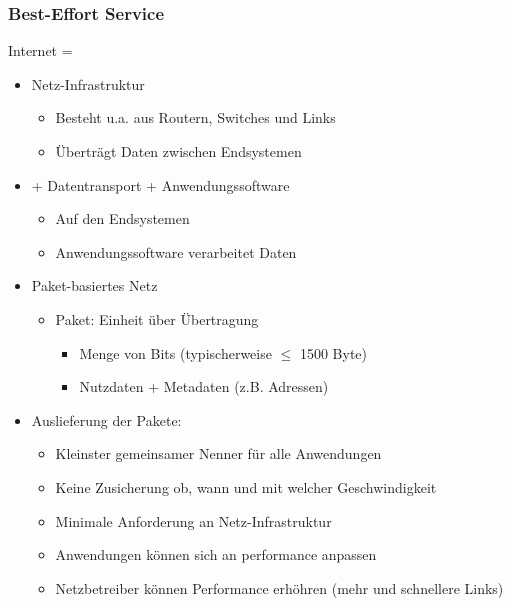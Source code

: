     \subsubsection{Best-Effort Service}
      Internet =
        \begin{itemize}
          \item Netz-Infrastruktur
            \begin{itemize}
              \item Besteht u.a. aus Routern, Switches und Links
              \item Überträgt Daten zwischen Endsystemen
            \end{itemize}
          \item + Datentransport + Anwendungssoftware
            \begin{itemize}
              \item Auf den Endsystemen
              \item Anwendungssoftware verarbeitet Daten
            \end{itemize}
          \item Paket-basiertes Netz
            \begin{itemize}
              \item Paket: Einheit über Übertragung
                \begin{itemize}
                  \item Menge von Bits (typischerweise $\le$ 1500 Byte)
                  \item Nutzdaten + Metadaten (z.B. Adressen)
                \end{itemize}
            \end{itemize}
          \item Auslieferung der Pakete:
            \begin{itemize}
              \item Kleinster gemeinsamer Nenner für alle Anwendungen
              \item Keine Zusicherung ob, wann und mit welcher Geschwindigkeit
              \item Minimale Anforderung an Netz-Infrastruktur
              \item Anwendungen können sich an performance anpassen
              \item Netzbetreiber können Performance erhöhren (mehr und schnellere Links)
            \end{itemize}
        \end{itemize}

